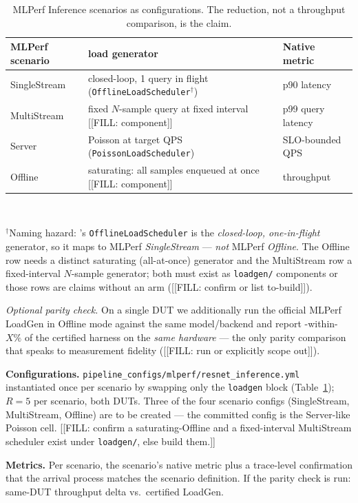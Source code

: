\begin{table}[t]\centering\small
\caption{MLPerf Inference scenarios as \sysname{} configurations. The
reduction, not a throughput comparison, is the claim.}
\label{tab:mlperf-map}
\begin{tabular}{@{}lll@{}}
\toprule
MLPerf scenario & \sysname{} load generator & Native metric \\
\midrule
SingleStream & closed-loop, 1 query in flight (\texttt{OfflineLoadScheduler}$^\dagger$) & p90 latency \\
MultiStream  & fixed $N$-sample query at fixed interval [[FILL: component]] & p99 query latency \\
Server       & Poisson at target QPS (\texttt{PoissonLoadScheduler})     & SLO-bounded QPS \\
Offline      & saturating: all samples enqueued at once [[FILL: component]] & throughput \\
\bottomrule
\end{tabular}
\\[2pt]
\raggedright\footnotesize $^\dagger$Naming hazard: \sysname{}'s
\texttt{OfflineLoadScheduler} is the \emph{closed-loop, one-in-flight}
generator, so it maps to MLPerf \emph{SingleStream} --- \emph{not} MLPerf
\emph{Offline}. The Offline row needs a distinct saturating
(all-at-once) generator and the MultiStream row a fixed-interval
$N$-sample generator; both must exist as \texttt{loadgen/} components or
those rows are claims without an arm ([[FILL: confirm or list to-build]]).
\end{table}

\emph{Optional parity check.} On a single DUT we additionally run the
official MLPerf LoadGen in Offline mode against the same
model/backend and report \sysname{}-within-$X\%$ of the certified
harness on the \emph{same hardware} --- the only parity comparison that
speaks to measurement fidelity ([[FILL: run or explicitly scope out]]).

\textbf{Configurations.}
\texttt{pipeline\_configs/mlperf/resnet\_inference.yml} instantiated once
per scenario by swapping only the \texttt{loadgen} block
(Table~\ref{tab:mlperf-map}); $R{=}5$ per scenario, both DUTs. Three of the
four scenario configs (SingleStream, MultiStream, Offline) are to be
created --- the committed config is the Server-like Poisson cell.
[[FILL: confirm a saturating-Offline and a fixed-interval MultiStream
scheduler exist under \texttt{loadgen/}, else build them.]]

\textbf{Metrics.} Per scenario, the scenario's native metric plus a
trace-level confirmation that the arrival process matches the scenario
definition. If the parity check is run: same-DUT throughput delta vs.\
certified LoadGen.

